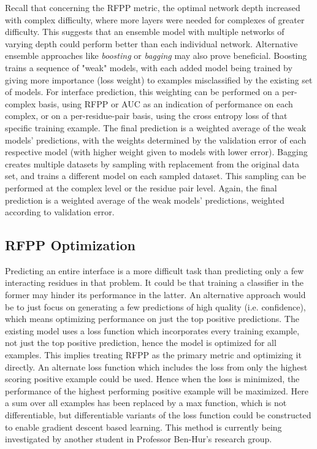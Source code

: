 Recall that concerning the RFPP metric, the optimal network depth increased with complex difficulty, where more layers were needed for complexes of greater difficulty. 
This suggests that an ensemble model with multiple networks of varying depth could perform  better than each individual network.
Alternative ensemble approaches like \emph{boosting} or \emph{bagging} may also prove beneficial.
Boosting trains a sequence of "weak" models, with each added model being trained by giving more importance (loss weight) to examples misclassified by the existing set of models.
For interface prediction, this weighting can be performed on a per-complex basis, using RFPP or AUC as an indication of performance on each complex, or on a per-residue-pair basis, using the cross entropy loss of that specific training example.
The final prediction is a weighted average of the weak models' predictions, with the weights determined by the validation error of each respective model (with higher weight given to models with lower error).
Bagging creates multiple datasets by sampling with replacement from the original data set, and trains a different model on each sampled dataset.
This sampling can be performed at the complex level or the residue pair level.
Again, the final prediction is a weighted average of the weak models' predictions, weighted according to validation error.



\subsection{RFPP Optimization}

Predicting an entire interface is a more difficult task than predicting only a few interacting residues in that problem.
It could be that training a classifier in the former may hinder its performance in the latter.
An alternative approach would be to just focus on generating a few predictions of high quality (i.e. confidence), which means optimizing performance on just the top positive predictions.
The existing model uses a loss function which incorporates every training example, not just the top positive prediction, hence the model is optimized for all examples.
This implies treating RFPP as the primary metric and optimizing it directly.
An alternate loss function which includes the loss from only the highest scoring positive example could be used.
Hence when the loss is minimized, the performance of the highest performing positive example will be maximized.
Here a sum over all examples has been replaced by a max function, which is not differentiable, but differentiable variants of the loss function could be constructed to enable gradient descent based learning.
This method is currently being investigated by another student in Professor Ben-Hur's research group.

